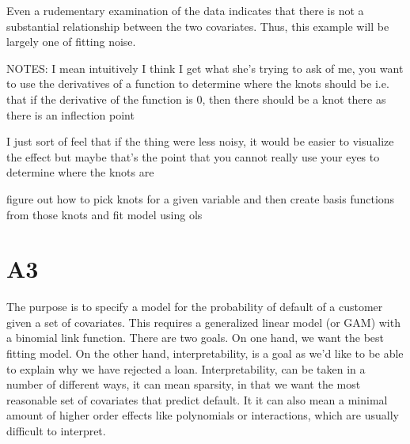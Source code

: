 Even a rudementary examination of the data indicates that there is not a substantial relationship between the two covariates. Thus, this example will be largely one of fitting noise.

NOTES:
I mean intuitively I think I get what she's trying to ask of me, you want to use the derivatives of a function to determine where the knots should be
i.e. that if the derivative of the function is 0, then there should be a knot there as there is an inflection point

I just sort of feel that if the thing were less noisy, it would be easier to visualize the effect
but maybe that's the point
that you cannot really use your eyes to determine where the knots are

figure out how to pick knots for a given variable
and then create basis functions from those knots
and fit model using ols


\section{A3}


The purpose is to specify a model for the probability of default of a customer given a set of covariates. This requires a generalized linear model (or GAM) with a binomial link function. There are two goals. On one hand, we want the best fitting model. On the other hand, interpretability, is a goal as we'd like to be able to explain why we have rejected a loan. Interpretability, can be taken in a number of different ways, it can mean sparsity, in that we want the most reasonable set of covariates that predict default. It it can also mean a minimal amount of higher order effects like polynomials or interactions, which are usually difficult to interpret. 

